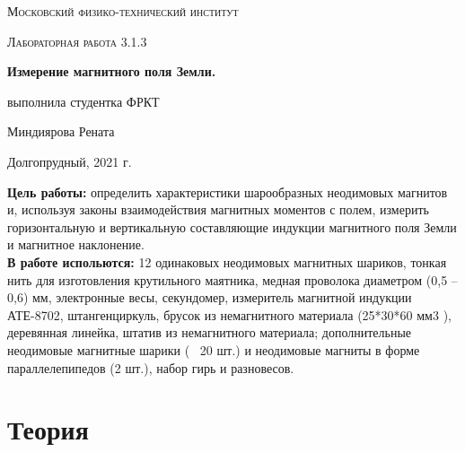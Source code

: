 \documentclass[a4paper,12pt]{article}
\begin{document}
\begin{titlepage}
	\centering
	\vspace{5cm}
	{\scshape\LARGE Московский физико-технический институт \par}
	\vspace{4cm}
	{\scshape\Large Лабораторная работа 3.1.3 \par}
	\vspace{1cm}
	{\huge\bfseries Измерение магнитного поля Земли. \par}
	\vspace{1cm}
	\vfill
\begin{flushright}
	{\large выполнила студентка ФРКТ \par}
	\vspace{0.3cm}
	{\LARGE Миндиярова Рената}
\end{flushright}
	

	\vfill

	Долгопрудный, 2021 г.
\end{titlepage}

\textbf{Цель работы:} определить характеристики шарообразных неодимовых магнитов и, используя
законы взаимодействия магнитных моментов с полем, измерить горизонтальную и вертикальную
составляющие индукции магнитного поля Земли и магнитное наклонение.\\
\textbf{В работе испольются:}
12 одинаковых неодимовых магнитных шариков, тонкая нить для
изготовления крутильного маятника, медная проволока диаметром (0,5 – 0,6) мм, электронные весы,
секундомер, измеритель магнитной индукции АТЕ-8702, штангенциркуль, брусок из немагнитного
материала (25*30*60 мм3
), деревянная линейка, штатив из немагнитного материала;
дополнительные неодимовые магнитные шарики (~ 20 шт.) и неодимовые магниты в форме параллелепипедов (2 шт.), набор гирь и разновесов.
\section*{Теория}
\end{document}
